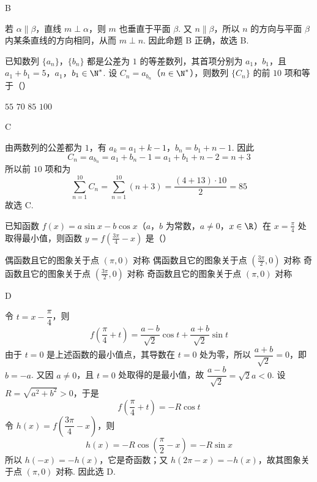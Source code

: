 \begin{answer}
B
\end{answer}

\begin{solution}
若 \(\alpha\parallel\beta\)，直线 \(m\perp\alpha\)，则 \(m\) 也垂直于平面 \(\beta\). 又 \(n\parallel\beta\)，所以 \(n\) 的方向与平面 \(\beta\) 内某条直线的方向相同，从而 \(m\perp n\). 因此命题 B 正确，故选 B.
\end{solution}

\begin{problem}
已知数列 \(\{a_{n}\}\)，\(\{b_{n}\}\) 都是公差为 \(1\) 的等差数列，其首项分别为 \(a_{1}\)，\(b_{1}\)，且 \(a_{1}+b_{1}=5\)，\(a_{1}\)，\(b_{1}\in\N^{*}\). 设 \(C_{n}=a_{b_{n}}\)（\(n\in\N^{*}\)），则数列 \(\{C_{n}\}\) 的前 \(10\) 项和等于（\quad）

\choices
    {\(55\)}
    {\(70\)}
    {\(85\)}
    {\(100\)}
\end{problem}

\begin{answer}
C
\end{answer}

\begin{solution}
由两数列的公差都为 \(1\)，有
\(a_{k}=a_{1}+k-1\)，\(b_{n}=b_{1}+n-1\).
因此
\[
C_{n}=a_{b_{n}}=a_{1}+b_{n}-1=a_{1}+b_{1}+n-2=n+3
\]
所以前 \(10\) 项和为
\[
\sum_{n=1}^{10}C_{n}=\sum_{n=1}^{10}(n+3)=\frac{(4+13)\cdot10}{2}=85
\]
故选 C.
\end{solution}

\begin{problem}
已知函数 \(f(x)=a\sin x-b\cos x\)（\(a\)，\(b\) 为常数，\(a\neq 0\)，\(x\in\R\)）在 \(x=\frac{\pi}{4}\) 处取得最小值，则函数 \(y=f\left(\frac{3\pi}{4}-x\right)\) 是（\quad）

\choices
    {偶函数且它的图象关于点 \((\pi,0)\) 对称}
    {偶函数且它的图象关于点 \(\left(\frac{3\pi}{2},0\right)\) 对称}
    {奇函数且它的图象关于点 \(\left(\frac{3\pi}{2},0\right)\) 对称}
    {奇函数且它的图象关于点 \((\pi,0)\) 对称}
\end{problem}

\begin{answer}
D
\end{answer}

\begin{solution}
令 \(t=x-\dfrac{\pi}{4}\)，则
\[
f\left(\frac{\pi}{4}+t\right)=\frac{a-b}{\sqrt2}\cos t+\frac{a+b}{\sqrt2}\sin t
\]
由于 \(t=0\) 是上述函数的最小值点，其导数在 \(t=0\) 处为零，所以 \(\dfrac{a+b}{\sqrt2}=0\)，即 \(b=-a\). 又因 \(a\neq0\)，且 \(t=0\) 处取得的是最小值，故 \(\dfrac{a-b}{\sqrt2}=\sqrt2a<0\). 设 \(R=\sqrt{a^{2}+b^{2}}>0\)，于是
\[
f\left(\frac{\pi}{4}+t\right)=-R\cos t
\]
令 \(h(x)=f\left(\dfrac{3\pi}{4}-x\right)\)，则
\[
h(x)=-R\cos\left(\frac{\pi}{2}-x\right)=-R\sin x
\]
所以 \(h(-x)=-h(x)\)，它是奇函数；又 \(h(2\pi-x)=-h(x)\)，故其图象关于点 \((\pi,0)\) 对称. 因此选 D.
\end{solution}


